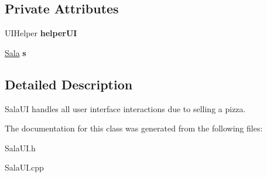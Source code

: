 \subsection*{Private Attributes}
\begin{CompactItemize}
\item 
\hypertarget{class_sala_u_i_165ca02db075e280199e0970e3465900}{
UIHelper {\bf helper\-UI}}
\label{class_sala_u_i_165ca02db075e280199e0970e3465900}

\item 
\hypertarget{class_sala_u_i_03c7c0ace395d80182db07ae2c30f034}{
\hyperlink{class_sala}{Sala} {\bf s}}
\label{class_sala_u_i_03c7c0ace395d80182db07ae2c30f034}

\end{CompactItemize}


\subsection{Detailed Description}
Sala\-UI handles all user interface interactions due to selling a pizza. 



The documentation for this class was generated from the following files:\begin{CompactItemize}
\item 
Sala\-UI.h\item 
Sala\-UI.cpp\end{CompactItemize}
